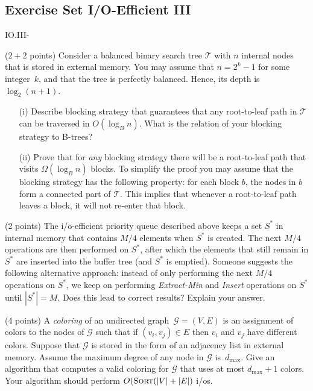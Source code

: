 \documentclass{article}
\newcommand{\G}{\ensuremath{\mathcal{G}}}
\newcommand{\tree}{\ensuremath{\mathcal{T}}}
\newcommand{\io}{{\sc i/o}\xspace}
\newcommand{\ios}{{\io}s\xspace}
\newcommand{\sort}{\mbox{\sc Sort}}
\newcounter{rcounter}
\newenvironment{rlist}%
{\begin{list}{\setnr-\arabic{rcounter}}{\usecounter{rcounter}}}{\end{list}}
\begin{document}
    
    
    
    \renewcommand{\setnr}{IO.III}
    \subsection*{Exercise Set I/O-Efficient III}
    
    \begin{rlist}
        
        \item ($2 + 2$ points)
        Consider a balanced binary search tree $\tree$ with $n$ internal nodes that is stored in external memory.
        You may assume that $n=2^k-1$ for some integer~$k$, and that the tree is perfectly balanced.
        Hence, its depth is~$\log_2 (n+1)$.
        \begin{enumerate}
            \item[(i)]
            Describe blocking strategy that guarantees that any root-to-leaf
            path in $\tree$ can be traversed in $O(\log_B n)$. What is the relation of your blocking
            strategy to B-trees?
            \item[(ii)]
            Prove that for \emph{any} blocking strategy there will be a root-to-leaf path that
            visits $\Omega(\log_B n)$ blocks. To simplify the proof you may assume that
            the blocking strategy has the following property: for each block $b$, the nodes in
            $b$ form a connected part of $\tree$. This implies that whenever a root-to-leaf path
            leaves a block, it will not re-enter that block. 
        \end{enumerate}
        
        \item (2 points)
        The \io-efficient priority queue described above keeps a set $S^*$ in internal memory
        that contains $M/4$ elements when $S^*$ is created. The next $M/4$ operations are then
        performed on $S^*$, after which the elements that still remain in $S^*$ are inserted
        into the buffer tree (and $S^*$ is emptied).
        Someone suggests the following alternative approach: instead of only performing
        the next $M/4$ operations on $S^*$, we keep on performing
        \emph{Extract-Min} and \emph{Insert} operations on $S^*$ until $|S^*|=M$.
        Does this lead to correct results? Explain your answer.
        
        \item (4 points)
        A \emph{coloring} of an undirected graph~$\G=(V,E)$ is an assignment of colors to
        the nodes of $\G$ such that if $(v_i,v_j)\in E$ then $v_i$ and $v_j$ have different colors.
        Suppose that $\G$ is stored in the form of an adjacency list in external memory.
        Assume the maximum degree of any node in $\G$ is~$d_{\max}$. Give an algorithm that computes
        a valid coloring for $\G$ that uses at most $d_{\max}+1$ colors. Your algorithm should perform
        $O(\sort(|V|+|E|)$ \ios.
        
    \end{rlist}
    
\end{document}
